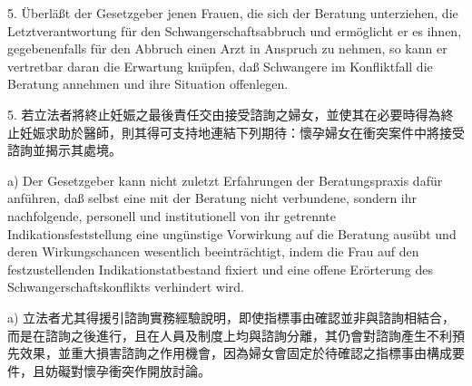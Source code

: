\documentclass[12pt]{article}
\begin{document}
\begin{sourcepara}[title={原文D.79}]
5. Überläßt der Gesetzgeber jenen Frauen, die sich der Beratung unterziehen, die Letztverantwortung für den Schwangerschaftsabbruch und ermöglicht er es ihnen, gegebenenfalls für den Abbruch einen Arzt in Anspruch zu nehmen, so kann er vertretbar daran die Erwartung knüpfen, daß Schwangere im Konfliktfall die Beratung annehmen und ihre Situation offenlegen.
\end{sourcepara}
\begin{transpara}
5. 若立法者將終止妊娠之最後責任交由接受諮詢之婦女，並使其在必要時得為終止妊娠求助於醫師，則其得可支持地連結下列期待：懷孕婦女在衝突案件中將接受諮詢並揭示其處境。
\end{transpara}

\begin{sourcepara}[title={原文D.80}]
a) Der Gesetzgeber kann nicht zuletzt Erfahrungen der Beratungspraxis dafür anführen, daß selbst eine mit der Beratung nicht verbundene, sondern ihr nachfolgende, personell und institutionell von ihr getrennte Indikationsfeststellung eine ungünstige Vorwirkung auf die Beratung ausübt und deren Wirkungschancen wesentlich beeinträchtigt, indem die Frau auf den festzustellenden Indikationstatbestand fixiert und eine offene Erörterung des Schwangerschaftskonflikts verhindert wird.
\end{sourcepara}
\begin{transpara}
a) 立法者尤其得援引諮詢實務經驗說明，即使指標事由確認並非與諮詢相結合，而是在諮詢之後進行，且在人員及制度上均與諮詢分離，其仍會對諮詢產生不利預先效果，並重大損害諮詢之作用機會，因為婦女會固定於待確認之指標事由構成要件，且妨礙對懷孕衝突作開放討論。
\end{transpara}
\end{document}
